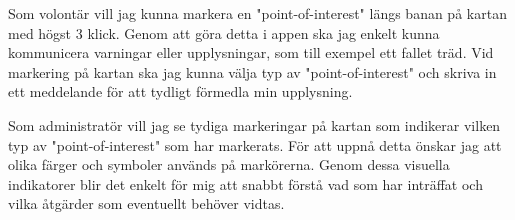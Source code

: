 \vspace{1em}

Som volontär vill jag kunna markera en "point-of-interest" längs banan på kartan med högst 3 klick. Genom att göra detta i appen ska jag enkelt kunna kommunicera varningar eller upplysningar, som till exempel ett fallet träd. Vid markering på kartan ska jag kunna välja typ av "point-of-interest" och skriva in ett meddelande för att tydligt förmedla min upplysning.
\vspace{1em}

Som administratör vill jag se tydiga markeringar på kartan som indikerar vilken typ av "point-of-interest" som har markerats. För att uppnå detta önskar jag att olika färger och symboler används på markörerna. Genom dessa visuella indikatorer blir det enkelt för mig att snabbt förstå vad som har inträffat och vilka åtgärder som eventuellt behöver vidtas.



